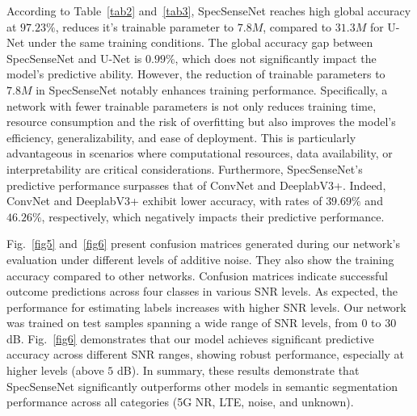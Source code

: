 \documentclass[conference]{IEEEtran} %
\begin{document}

According to Table~\ref{tab2} and~\ref{tab3}, SpecSenseNet reaches high global accuracy at $97.23\%$, reduces it's trainable parameter to $7.8M$, compared to $31.3M$ for U-Net under the same training conditions. The global accuracy gap between SpecSenseNet and U-Net is $0.99\%$, which does not significantly impact the model's predictive ability. However, the reduction of trainable parameters to $7.8M$ in SpecSenseNet notably enhances training performance. Specifically, a network with fewer trainable parameters is not only reduces training time, resource consumption and the risk of overfitting but also improves the model's efficiency, generalizability, and ease of deployment. This is particularly advantageous in scenarios where computational resources, data availability, or interpretability are critical considerations. Furthermore, SpecSenseNet's predictive performance surpasses that of ConvNet\cite{huynhthe2023intelligence} and DeeplabV3+\cite{nguyen2023accurate}. Indeed, ConvNet\cite{huynhthe2023intelligence} and DeeplabV3+\cite{nguyen2023accurate} exhibit lower accuracy, with rates of $39.69\%$ and $46.26\%$, respectively, which negatively impacts their predictive performance.

Fig.~\ref{fig5} and~\ref{fig6} present confusion matrices generated during our network's evaluation under different levels of additive noise. They also show the training accuracy compared to other networks. Confusion matrices indicate successful outcome predictions across four classes in various SNR levels. As expected, the performance for estimating labels increases with higher SNR levels. Our network was trained on test samples spanning a wide range of SNR levels, from $0$ to $30$ dB. Fig.~\ref{fig6} demonstrates that our model achieves significant predictive accuracy across different SNR ranges, showing robust performance, especially at higher levels (above $5$ dB). In summary, these results demonstrate that SpecSenseNet significantly outperforms other models in semantic segmentation performance across all categories (5G NR, LTE, noise, and unknown).
\end{document}
